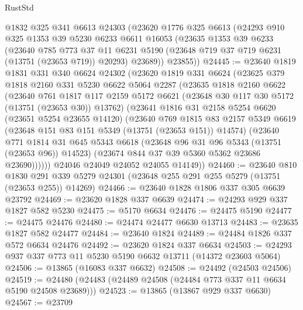 \begin{lexlean}{RustStd}
\begin{coremodule}
    @1832
    @325
    @341
    @6613
    @24303
    (@23620
      @1776
      @325
      @6613
      (@24293
        @910
        @325
        @1353
        @39
        @5230
        @6233
        @6611
        @16053
        (@23635
          @1353
          @39
          @6233
          (@23640
            @785
            @773
            @37
            @11
            @6231
            @5190
            (@23648 @719 @37 @719 @6231 (@13751 (@23653 @719)) @20293)
            @23689))
        @23855))
@24445 := @23640
    @1819
    @1831
    @331
    @340
    @6624
    @24302
    (@23620
      @1819
      @331
      @6624
      (@23625
        @379
        @1818
        @2160
        @331
        @5230
        @6622
        @5064
        @2287
        (@23635
          @1818
          @2160
          @6622
          (@23640
            @761
            @1817
            @117
            @2159
            @5172
            @6621
            (@23648 @30 @117 @30 @5172 (@13751 (@23653 @30)) @13762)
            (@23641
              @1816
              @31
              @2158
              @5254
              @6620
              (@23651 @5254 @23655 @14120)
              (@23640
                @769
                @1815
                @83
                @2157
                @5349
                @6619
                (@23648 @151 @83 @151 @5349 (@13751 (@23653 @151)) @14574)
                (@23640
                  @771
                  @1814
                  @31
                  @645
                  @5343
                  @6618
                  (@23648 @96 @31 @96 @5343 (@13751 (@23653 @96)) @14523)
                  (@23674 @844 @37 @39 @5360 @5362 @23686 @23690))))))
        @24046
        @24049
        @24052
        @24055
        @14149))
@24460 := @23640
    @810
    @1830
    @291
    @339
    @5279
    @24301
    (@23648 @255 @291 @255 @5279 (@13751 (@23653 @255)) @14269)
@24466 := @23640 @1828 @1806 @337 @305 @6639 @23792
@24469 := @23620 @1828 @337 @6639
@24474 := @24293 @929 @337 @1827 @582 @5230
@24475 := @5170 @6634
@24476 := @24475 @5190
@24477 := @24475 @24476
@24480 := @24474 @24477 @6630 @13713
@24483 := @23635 @1827 @582 @24477
@24484 := @23640 @1824
@24489 := @24484 @1826 @337 @572 @6634 @24476
@24492 := @23620 @1824 @337 @6634
@24503 := @24293 @937 @337 @773 @11 @5230 @5190 @6632 @13711 (@14372 @23603 @5064)
@24506 := @13865 (@16083 @337 @6632)
@24508 := @24492 (@24503 @24506)
@24519 := @24480 (@24483 (@24489 @24508 (@24484 @773 @337 @11 @6634 @5190 @24508 @23689)))
@24523 := @13865 (@13867 @929 @337 @6630)
@24567 := @23709

\end{coremodule}
\end{lexlean}
